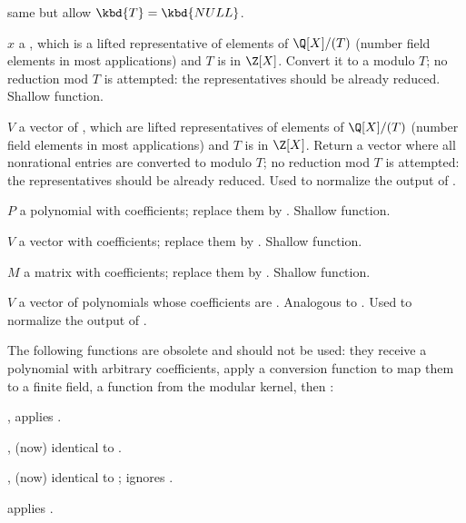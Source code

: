  same but allow
$\kbd{T} = \kbd{NULL}$.



 $x$ a , which is
a lifted representative of elements of $\Q[X]/(T)$ (number field elements
in most applications) and $T$ is in $\Z[X]$. Convert it to a 
modulo $T$; no reduction mod $T$ is attempted: the representatives should be
already reduced. Shallow function.

 $V$ a vector of , which
are lifted representatives of elements of $\Q[X]/(T)$ (number field elements
in most applications) and $T$ is in $\Z[X]$. Return a vector where all
nonrational entries are converted to  modulo $T$; no reduction
mod $T$ is attempted: the representatives should be already reduced. Used to
normalize the output of .

 $P$ a polynomial with 
coefficients; replace them by . Shallow function.

 $V$ a vector with 
coefficients; replace them by . Shallow function.

 $M$ a matrix with 
coefficients; replace them by . Shallow function.

 $V$ a vector of polynomials whose
coefficients are . Analogous to .
Used to normalize the output of .

The following functions are obsolete and should not be used: they receive a
polynomial with arbitrary coefficients, apply a conversion function to map
them to a finite field, a function from the modular kernel, then
:

, applies .

, (now) identical to .

, (now) identical to
; ignores \fl.

 applies .

